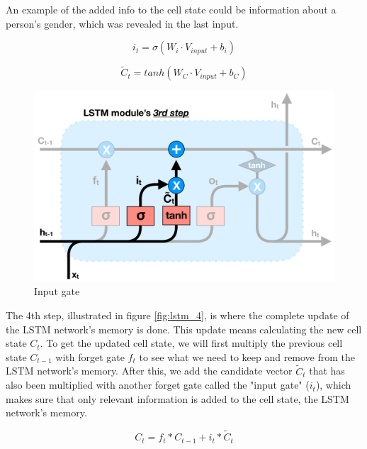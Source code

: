 An example of the added info to the cell state could be information about a person's gender, which was revealed in the last input.

\begin{equation} \label{eq:input}
    i_t = \sigma ( W_i \cdot V_{input} + b_i)
\end{equation}

\begin{equation} \label{eq:candidate}
    \widetilde{C}_t = tanh ( W_C \cdot V_{input} + b_C)
\end{equation}

\begin{figure}[h]
    \centering
    \includegraphics[width=12cm,height=\textheight,keepaspectratio]{lstm_3}
    \caption{Input gate}
    \label{fig:lstm_3}
\end{figure}

The 4th step, illustrated in figure \ref{fig:lstm_4}, is where the complete update of the LSTM network's memory is done. This update means calculating the new cell state $C_t$. To get the updated cell state, we will first multiply the previous cell state $C_{t-1}$ with forget gate $f_t$ to see what we need to keep and remove from the LSTM network's memory. After this, we add the candidate vector $\widetilde{C}_t$ that has also been multiplied with another forget gate called the "input gate" ($i_t$), which makes sure that only relevant information is added to the cell state, the LSTM network's memory.

\begin{equation}
       C_t = f_t * C_{t-1} + i_t * \widetilde{C}_t
\end{equation}

